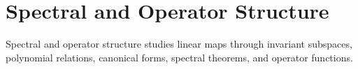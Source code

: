 \section{Spectral and Operator Structure}

Spectral and operator structure studies linear maps through invariant subspaces, polynomial relations, canonical forms, spectral theorems, and operator functions.












